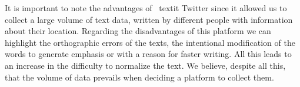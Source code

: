 It is important to note the advantages of \ textit {Twitter} since it allowed us to collect a large volume of text data, written by different people with information about their location. Regarding the disadvantages of this platform we can highlight the orthographic errors of the texts, the intentional modification of the words to generate emphasis or with a reason for faster writing. All this leads to an increase in the difficulty to normalize the text. We believe, despite all this, that the volume of data prevails when deciding a platform to collect them.
